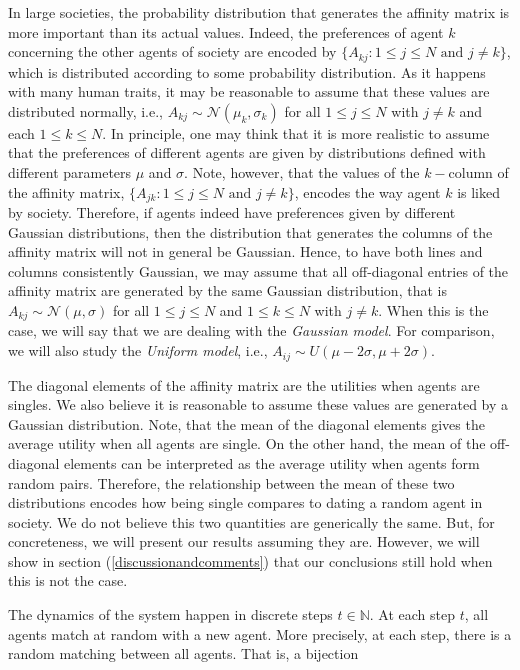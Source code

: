 \documentclass[12pt]{article}
\begin{document}
In large societies, the probability distribution that generates the affinity matrix is more important than its actual values. Indeed, the preferences of agent $k$ concerning the other agents of society are encoded by $\{A_{kj}:1\leq j\leq N\textrm{ and } j\neq k\}$, which is distributed according to some probability distribution. As it happens with many human traits, it may be reasonable to assume that these values are distributed normally, i.e., $A_{kj}\sim\mathcal{N}(\mu_k,\sigma_k)$ for all $1\leq j\leq N$ with $j\neq k$ and each $1\leq k\leq N$. In principle, one may think that it is more realistic to assume that the preferences of different agents are given by distributions defined with different parameters $\mu$ and $\sigma$. Note, however, that the values of the $k-$column of the affinity matrix, $\{A_{jk}:1\leq j\leq N\textrm{ and } j\neq k\}$, encodes the way agent $k$ is liked by society. Therefore, if agents indeed have preferences given by different Gaussian distributions, then the distribution that generates the columns of the affinity matrix will not in general be Gaussian. Hence, to have both lines and columns consistently Gaussian, we may assume that all off-diagonal entries of the affinity matrix are generated by the same Gaussian distribution, that is $A_{kj}\sim\mathcal{N}(\mu,\sigma)$ for all $1\leq j\leq N$ and $1\leq k\leq N$ with $j\neq k$. When this is the case, we will say that we are dealing with the \textit{Gaussian model}. For comparison, we will also study the \textit{Uniform model}, i.e., $A_{ij}\sim U(\mu-2\sigma,\mu+2\sigma)$. 

The diagonal elements of the affinity matrix are the utilities when agents are singles. We also believe it is reasonable to assume these values are generated by a Gaussian distribution. Note, that the mean of the diagonal elements gives the average utility when all agents are single. On the other hand, the mean of the off-diagonal elements can be interpreted as the average utility when agents form random pairs. Therefore, the relationship between the mean of these two distributions encodes how being single compares to dating a random agent in society. We do not believe this two quantities are generically the same. But, for concreteness, we will present our results assuming they are. However, we will show in section (\ref{discussionandcomments}) that our conclusions still hold when this is not the case.

The dynamics of the system happen in discrete steps $t\in\mathbb{N}$. At each step $t$, all agents match at random with a new agent. More precisely, at each step, there is a random matching between all agents. That is, a bijection
\end{document}
